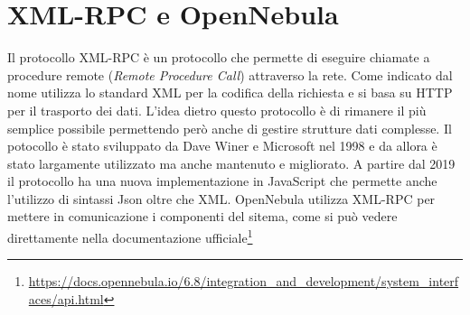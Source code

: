 \section{XML-RPC e OpenNebula}
Il protocollo XML-RPC\cite{xmlrpc} è un protocollo che permette di eseguire chiamate a procedure remote (\emph{Remote Procedure Call}) attraverso la rete. Come indicato dal nome utilizza lo standard XML per la codifica della richiesta e si basa su HTTP per il trasporto dei dati.\medbreak
L'idea dietro questo protocollo è di rimanere il più semplice possibile permettendo però anche di gestire strutture dati complesse. Il potocollo è stato sviluppato da Dave Winer e Microsoft nel 1998 e da allora è stato largamente utilizzato ma anche mantenuto e migliorato.
A partire dal 2019 il protocollo ha una nuova implementazione in JavaScript che permette anche l'utilizzo di sintassi Json oltre che XML.\medbreak
OpenNebula utilizza XML-RPC per mettere in comunicazione i componenti del sitema, come si può vedere direttamente nella documentazione ufficiale\footnote{\url{https://docs.opennebula.io/6.8/integration_and_development/system_interfaces/api.html}}